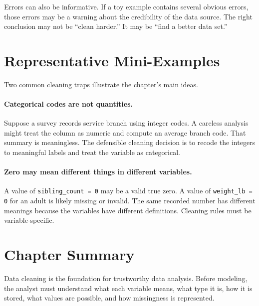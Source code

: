 {Errors can also be informative.  If a toy example contains several obvious errors, those errors may be a warning about the credibility of the data source.  The right conclusion may not be ``clean harder.''  It may be ``find a better data set.''

\section{Representative Mini-Examples}

Two common cleaning traps illustrate the chapter's main ideas.

\paragraph{Categorical codes are not quantities.}
Suppose a survey records service branch using integer codes.  A careless analysis might treat the column as numeric and compute an average branch code.  That summary is meaningless.  The defensible cleaning decision is to recode the integers to meaningful labels and treat the variable as categorical.

\paragraph{Zero may mean different things in different variables.}
A value of \texttt{sibling\_count = 0} may be a valid true zero.  A value of \texttt{weight\_lb = 0} for an adult is likely missing or invalid.  The same recorded number has different meanings because the variables have different definitions.  Cleaning rules must be variable-specific.

\section{Chapter Summary}

Data cleaning is the foundation for trustworthy data analysis.  Before modeling, the analyst must understand what each variable means, what type it is, how it is stored, what values are possible, and how missingness is represented.

}
